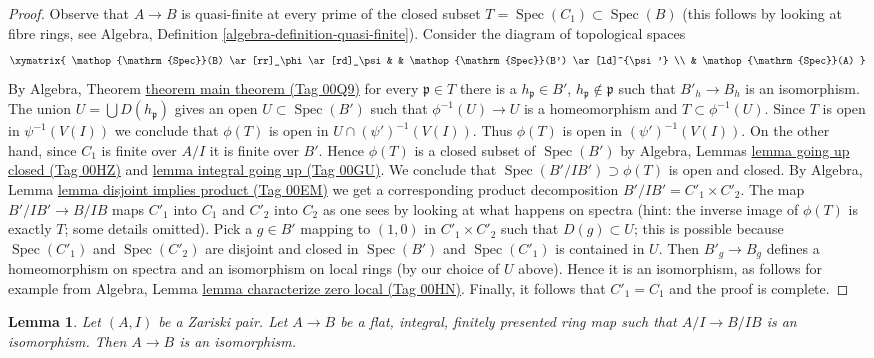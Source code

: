 \documentclass{amsart}
\theoremstyle{plain}
\newtheorem{lemma}[subsection]{Lemma}
\theoremstyle{definition}
\theoremstyle{remark}
\numberwithin{equation}{subsection}
\def\Spec{\mathop{\mathrm{Spec}}}
\begin{document}
\begin{proof}
Observe that $A \to B$ is quasi-finite at every prime of the
closed subset $T = \Spec(C_1) \subset \Spec(B)$ (this follows
by looking at fibre rings, see
Algebra, Definition \ref{algebra-definition-quasi-finite}).
Consider the diagram of topological spaces
$$
\xymatrix{
\Spec(B) \ar[rr]_\phi \ar[rd]_\psi & & \Spec(B') \ar[ld]^{\psi'} \\
& \Spec(A)
}
$$
By Algebra, Theorem \href{https://stacks.math.columbia.edu/tag/00Q9}{theorem main theorem (Tag 00Q9)}
for every $\mathfrak p \in T$ there is a $h_\mathfrak p \in B'$,
$h_\mathfrak p \not \in \mathfrak p$ such that $B'_h \to B_h$ is
an isomorphism. The union $U = \bigcup D(h_\mathfrak p)$ gives an open
$U \subset \Spec(B')$ such that $\phi^{-1}(U) \to U$ is a homeomorphism
and $T \subset \phi^{-1}(U)$. Since $T$ is open in $\psi^{-1}(V(I))$
we conclude that $\phi(T)$ is open in $U \cap (\psi')^{-1}(V(I))$.
Thus $\phi(T)$ is open in $(\psi')^{-1}(V(I))$.
On the other hand, since $C_1$ is finite over $A/I$ it is
finite over $B'$. Hence $\phi(T)$ is a closed subset of $\Spec(B')$
by Algebra, Lemmas \href{https://stacks.math.columbia.edu/tag/00HZ}{lemma going up closed (Tag 00HZ)} and
\href{https://stacks.math.columbia.edu/tag/00GU}{lemma integral going up (Tag 00GU)}. We conclude that
$\Spec(B'/IB') \supset \phi(T)$ is open and closed. By
Algebra, Lemma \href{https://stacks.math.columbia.edu/tag/00EM}{lemma disjoint implies product (Tag 00EM)}
we get a corresponding product decomposition $B'/IB' = C'_1 \times C'_2$.
The map $B'/IB' \to B/IB$ maps $C'_1$ into $C_1$ and $C'_2$ into $C_2$
as one sees by looking at what happens on spectra (hint: the inverse
image of $\phi(T)$ is exactly $T$; some details omitted).
Pick a $g \in B'$ mapping to $(1, 0)$ in $C'_1 \times C'_2$
such that $D(g) \subset U$; this is possible because $\Spec(C'_1)$
and $\Spec(C'_2)$ are disjoint and closed in $\Spec(B')$ and
$\Spec(C'_1)$ is contained in $U$. Then $B'_g \to B_g$ defines a homeomorphism
on spectra and an isomorphism on local rings (by our choice of $U$ above).
Hence it is an isomorphism, as follows for example from
Algebra, Lemma \href{https://stacks.math.columbia.edu/tag/00HN}{lemma characterize zero local (Tag 00HN)}.
Finally, it follows that $C'_1 = C_1$ and the proof is complete.
\end{proof}


\begin{lemma}
\label{lemma-check-isomorphism-zariski}
Let $(A, I)$ be a Zariski pair. Let $A \to B$ be a flat,
integral, finitely presented ring map such that $A/I \to B/IB$
is an isomorphism. Then $A \to B$ is an isomorphism.
\end{lemma}
\end{document}
